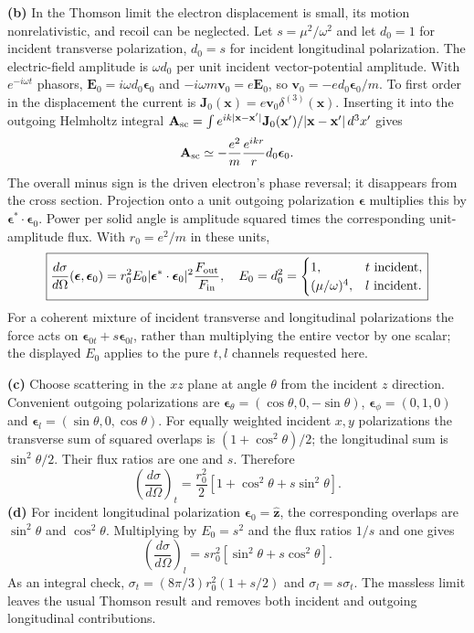 \medskip\noindent\textbf{(b)} In the Thomson limit the electron displacement is small, its motion
nonrelativistic, and recoil can be neglected.  Let
$s=\mu^2/\omega^2$ and let $d_0=1$ for incident transverse
polarization, $d_0=s$ for incident longitudinal polarization.
The electric-field amplitude is $\omega d_0$ per unit incident
vector-potential amplitude. With $e^{-i\omega t}$ phasors,
$\mathbf E_0=i\omega d_0\boldsymbol\epsilon_0$ and
$-i\omega m\mathbf v_0=e\mathbf E_0$, so
$\mathbf v_0=-ed_0\boldsymbol\epsilon_0/m$.
To first order in the displacement the current is
$\mathbf J_0(\mathbf x)=e\mathbf v_0\delta^{(3)}(\mathbf x)$.
Inserting it into the outgoing Helmholtz integral
$\mathbf A_{\rm sc}=\int e^{ik|\mathbf x-\mathbf x'|}
\mathbf J_0(\mathbf x')/|\mathbf x-\mathbf x'|\,d^3x'$
gives
\[
\mathbf A_{\rm sc}\simeq-\frac{e^2}{m}\frac{e^{ikr}}r
 d_0\boldsymbol\epsilon_0.
\]
The overall minus sign is the driven electron's phase reversal;
it disappears from the cross section.
Projection onto a unit outgoing polarization $\boldsymbol\epsilon$
multiplies this by $\boldsymbol\epsilon^*\cdot\boldsymbol\epsilon_0$.
Power per solid angle is amplitude squared times the corresponding
unit-amplitude flux.  With $r_0=e^2/m$ in these units,
\[
\boxed{\frac{d\sigma}{d\Omega}(\boldsymbol\epsilon,\boldsymbol\epsilon_0)
=r_0^2 E_0|\boldsymbol\epsilon^*\cdot\boldsymbol\epsilon_0|^2
 \frac{F_{\rm out}}{F_{\rm in}},\quad
E_0=d_0^2=\begin{cases}1,&t\hbox{ incident},\\
(\mu/\omega)^4,&l\hbox{ incident}.
\end{cases}}
\]
For a coherent mixture of incident transverse and longitudinal
polarizations the force acts on
$\boldsymbol\epsilon_{0t}+s\boldsymbol\epsilon_{0l}$, rather
than multiplying the entire vector by one scalar; the displayed
$E_0$ applies to the pure $t,l$ channels requested here.

\medskip\noindent\textbf{(c)} Choose scattering in the $xz$ plane at angle $\theta$ from the
incident $z$ direction.  Convenient outgoing polarizations are
$\boldsymbol\epsilon_\theta=(\cos\theta,0,-\sin\theta)$,
$\boldsymbol\epsilon_\phi=(0,1,0)$ and
$\boldsymbol\epsilon_l=(\sin\theta,0,\cos\theta)$.
For equally weighted incident $x,y$ polarizations the transverse
sum of squared overlaps is $(1+\cos^2\theta)/2$; the longitudinal
sum is $\sin^2\theta/2$.  Their flux ratios are one and $s$.
Therefore
\[
\boxed{\left(\frac{d\sigma}{d\Omega}\right)_t
=\frac{r_0^2}{2}[1+\cos^2\theta+s\sin^2\theta].}
\]
\medskip\noindent\textbf{(d)} For incident longitudinal polarization $\boldsymbol\epsilon_0=
\widehat{\mathbf z}$, the corresponding overlaps are
$\sin^2\theta$ and $\cos^2\theta$.
Multiplying by $E_0=s^2$ and the flux ratios $1/s$ and one gives
\[
\boxed{\left(\frac{d\sigma}{d\Omega}\right)_l
=s r_0^2[\sin^2\theta+s\cos^2\theta].}
\]
As an integral check,
$\sigma_t=(8\pi/3)r_0^2(1+s/2)$ and $\sigma_l=s\sigma_t$.
The massless limit leaves the usual Thomson result and removes
both incident and outgoing longitudinal contributions.

